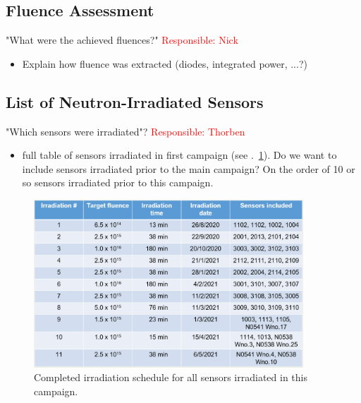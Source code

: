 \subsection{Fluence Assessment}
"What were the achieved fluences?" \textcolor{red}{Responsible: Nick}
\label{subsec:fluence_assessment}
\begin{itemize}
  \item Explain how fluence was extracted (diodes, integrated power, ...?)
\end{itemize}

\subsection{List of Neutron-Irradiated Sensors}
\label{subsec:sensors_irradiation}
"Which sensors were irradiated"? \textcolor{red}{Responsible: Thorben}
\begin{itemize}
  \item full table of sensors irradiated in first campaign (see .~\ref{fig:Irradiation_Schedule}). Do we want to include sensors irradiated prior to the main campaign? On the order of 10 or so sensors irradiated prior to this campaign.
\end{itemize}

\begin{figure}[!hbt]
  \begin{center}
    \includegraphics[width=0.90\textwidth]{figures/Completed_Irradiation_Schedule_at_RINSC}
    \caption{Completed irradiation schedule for all sensors irradiated in this campaign.}
    \label{fig:Irradiation_Schedule}
  \end{center}
\end{figure}


